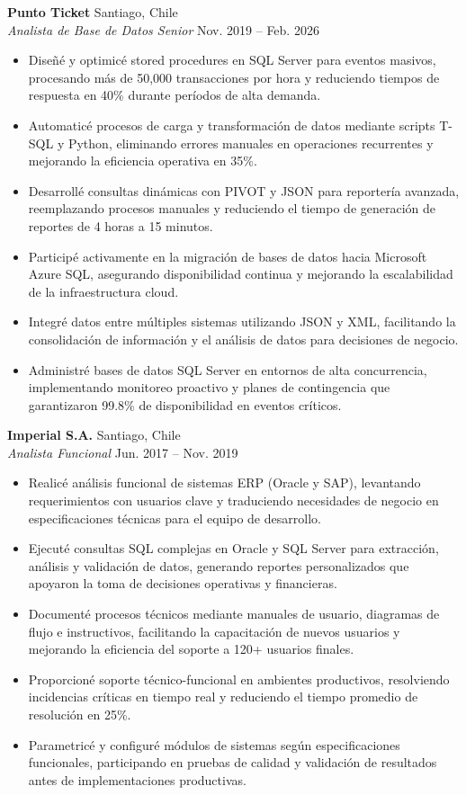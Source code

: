 \documentclass[11pt,letterpaper]{article}
\begin{document}
\textbf{Punto Ticket} \hfill Santiago, Chile\\
\textit{Analista de Base de Datos Senior} \hfill Nov. 2019 – Feb. 2026
\begin{itemize}
  \item Diseñé y optimicé stored procedures en SQL Server para eventos masivos, procesando más de 50,000 transacciones por hora y reduciendo tiempos de respuesta en 40\% durante períodos de alta demanda.
  \item Automaticé procesos de carga y transformación de datos mediante scripts T-SQL y Python, eliminando errores manuales en operaciones recurrentes y mejorando la eficiencia operativa en 35\%.
  \item Desarrollé consultas dinámicas con PIVOT y JSON para reportería avanzada, reemplazando procesos manuales y reduciendo el tiempo de generación de reportes de 4 horas a 15 minutos.
  \item Participé activamente en la migración de bases de datos hacia Microsoft Azure SQL, asegurando disponibilidad continua y mejorando la escalabilidad de la infraestructura cloud.
  \item Integré datos entre múltiples sistemas utilizando JSON y XML, facilitando la consolidación de información y el análisis de datos para decisiones de negocio.
  \item Administré bases de datos SQL Server en entornos de alta concurrencia, implementando monitoreo proactivo y planes de contingencia que garantizaron 99.8\% de disponibilidad en eventos críticos.
\end{itemize}
\vspace{2pt}
\textbf{Imperial S.A.} \hfill Santiago, Chile\\
\textit{Analista Funcional} \hfill Jun. 2017 – Nov. 2019
\begin{itemize}
  \item Realicé análisis funcional de sistemas ERP (Oracle y SAP), levantando requerimientos con usuarios clave y traduciendo necesidades de negocio en especificaciones técnicas para el equipo de desarrollo.
  \item Ejecuté consultas SQL complejas en Oracle y SQL Server para extracción, análisis y validación de datos, generando reportes personalizados que apoyaron la toma de decisiones operativas y financieras.
  \item Documenté procesos técnicos mediante manuales de usuario, diagramas de flujo e instructivos, facilitando la capacitación de nuevos usuarios y mejorando la eficiencia del soporte a 120+ usuarios finales.
  \item Proporcioné soporte técnico-funcional en ambientes productivos, resolviendo incidencias críticas en tiempo real y reduciendo el tiempo promedio de resolución en 25\%.
  \item Parametricé y configuré módulos de sistemas según especificaciones funcionales, participando en pruebas de calidad y validación de resultados antes de implementaciones productivas.
\end{itemize}
\end{document}
